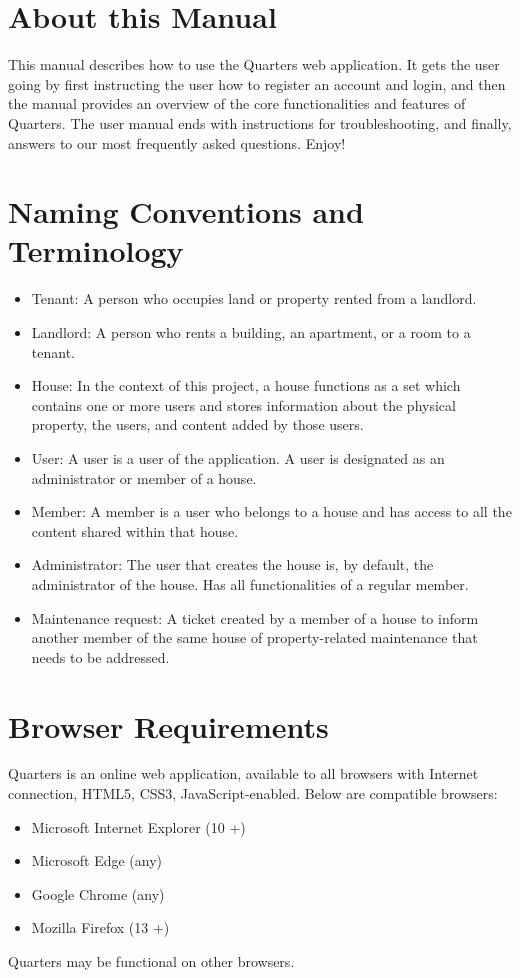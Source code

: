 \documentclass[12pt]{article}
\begin{document}
    \section{About this Manual}
    This manual describes how to use the Quarters web application. It gets the user going by first instructing the user how to register an account and login, and then the manual provides an overview of the core functionalities and features of Quarters. The user manual ends with instructions for troubleshooting, and finally, answers to our most frequently asked questions. Enjoy!

    \section{Naming Conventions and Terminology}
    \label{sec:conventions}
    \begin{itemize}
    \item Tenant: A person who occupies land or property rented from a landlord.
    \item Landlord: A person who rents a building, an apartment, or a room to a tenant.
    \item House: In the context of this project, a house functions as a set
      which contains one or more users and stores information about the
      physical property, the users, and content added by those users.
    \item User: A user is a user of the application. A user is designated as an administrator or member of a house.
    \item Member: A member is a user who belongs to a house and has access to all the content shared within that house.
    \item Administrator: The user that creates the house is, by default, the administrator of the house. Has all functionalities of a regular member.
    \item Maintenance request: A ticket created by a member of a house to inform another member of the same house of property-related maintenance that needs to be addressed.
    \end{itemize}

    \section{Browser Requirements}
    \label{sec:browserRequirement}
    Quarters is an online web application, available to all browsers with Internet connection, HTML5, CSS3, JavaScript-enabled. Below are compatible browsers:
    \begin{itemize}
        \item Microsoft Internet Explorer (10 +)
        \item Microsoft Edge (any)
        \item Google Chrome (any)
        \item Mozilla Firefox (13 +)
    \end{itemize}
    Quarters may be functional on other browsers.
\end{document}
